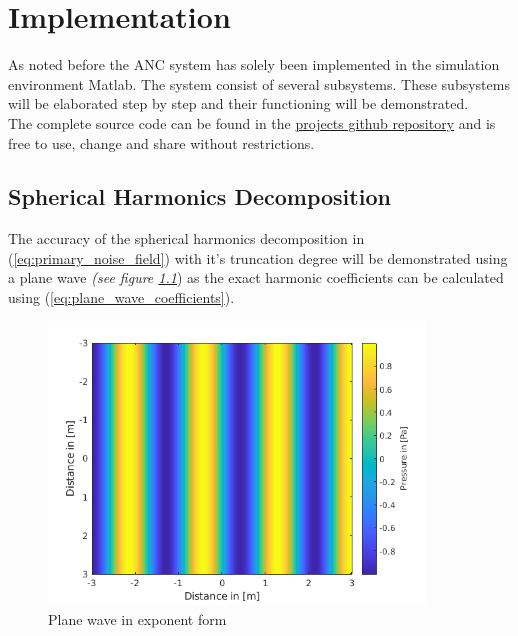 \chapter{Implementation}

As noted before the ANC system has solely been implemented in the simulation environment Matlab. The system consist of several subsystems. These subsystems will be elaborated step by step and their functioning will be demonstrated.\\
The complete source code can be found in the \color{blue}\href{https://github.com/leonardberresheim/MA---Active-Noise-Control-in-Spatial-Domains/tree/main/Matlab}{projects github repository} \color{black} and is free to use, change and share without restrictions.



\section{Spherical Harmonics Decomposition}
The accuracy of the spherical harmonics decomposition in (\ref{eq:primary_noise_field}) with it's truncation degree will be demonstrated using a plane wave \textit{(see figure \ref{fig:planeWaveExp}}) as the exact harmonic coefficients can be calculated using (\ref{eq:plane_wave_coefficients}).

\begin{figure}[H]
    \centerline{\includegraphics[width=100mm,keepaspectratio]{LaTeX/images/plots/plane_Wave_exponent_form.png}}
    \caption{Plane wave in exponent form}
    \label{fig:planeWaveExp}
\end{figure}

